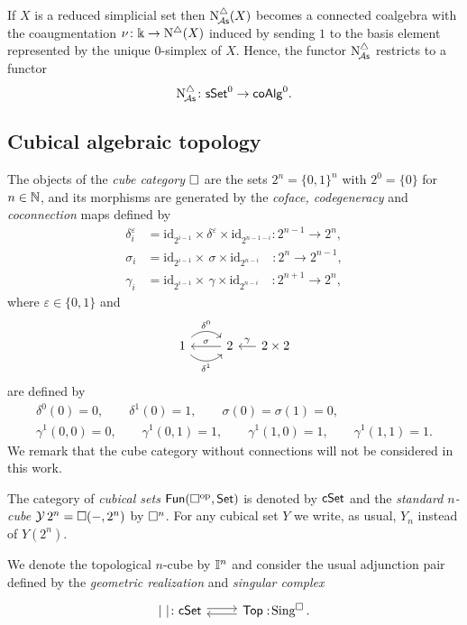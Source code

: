 If $X$ is a reduced simplicial set then $\operatorname{N^{\triangle}_{\!{\mathcal{A}\mathsf{s}}}}(X)$ becomes a connected coalgebra with the coaugmentation $\nu \colon \Bbbk \to \operatorname{N^{\triangle}}(X)$ induced by sending $1$ to the basis element represented by the unique $0$-simplex of $X$.
Hence, the functor $\operatorname{N^{\triangle}_{\!{\mathcal{A}\mathsf{s}}}}$ restricts to a functor
\[
\operatorname{N^{\triangle}_{\!{\mathcal{A}\mathsf{s}}}} \colon \mathsf{sSet}^0 \to \mathsf{coAlg}^0.
\]

\subsection{Cubical algebraic topology}

The objects of the \textit{cube category} $\square$ are the sets $2^n = \{0, 1\}^n$ with $2^0 = \{0\}$ for $n \in \mathbb{N}$, and its morphisms are generated by the \textit{coface, codegeneracy} and \textit{coconnection} maps defined by
\begin{align*}
	\delta_i^\varepsilon & =
	\mathrm{id}_{2^{i-1}} \times \delta^\varepsilon \times \mathrm{id}_{2^{n-1-i}} \colon 2^{n-1} \to 2^n, \\
	\sigma_i & =
	\mathrm{id}_{2^{i-1}} \times \, \sigma \times \mathrm{id}_{2^{n-i}} \quad \colon 2^{n} \to 2^{n-1}, \\
	\gamma_i & =
	\mathrm{id}_{2^{i-1}} \times \, \gamma \times \mathrm{id}_{2^{n-i}} \quad \colon 2^{n+1} \to 2^{n},
\end{align*}
where $\varepsilon \in \{0,1\}$ and
\[
\begin{tikzcd}
	1 \arrow[r, out=45, in=135, "\delta^0"] \arrow[r, out=-45, in=-135, "\delta^1"'] & 2 \arrow[l, "\sigma"'] &[-10pt] \arrow[l, "\gamma"'] 2 \times 2
\end{tikzcd}
\]
are defined by
\begin{gather*}
	\delta^0(0) = 0, \qquad
	\delta^1(0) = 1, \qquad
	\sigma(0) = \sigma(1) = 0, \qquad \\
	\gamma^1(0,0) = 0, \qquad
	\gamma^1(0,1) = 1, \qquad
	\gamma^1(1,0) = 1, \qquad
	\gamma^1(1,1) = 1.
\end{gather*}
We remark that the cube category without connections will not be considered in this work.

The category of \textit{cubical sets} $\mathsf{Fun}(\square^{\mathrm{op}}, \mathsf{Set})$ is denoted by $\mathsf{cSet}$ and
the \textit{standard $n$-cube} $\operatorname{\mathcal{Y}} 2^n = \square(-, 2^n)$ by $\square^n$.
For any cubical set $Y$ we write, as usual, $Y_n$ instead of $Y(2^n)$.

We denote the topological $n$-cube by $\mathbb{I}^{n}$ and consider the usual adjunction pair defined by the \textit{geometric realization} and \textit{singular complex}
\[
\begin{tikzcd}
	\bars{\ } \colon \cSet  \arrow[r, shift left=.5ex] &
	\Top :\! \cSing. \arrow[l, shift left=.5ex]
\end{tikzcd}
\]

